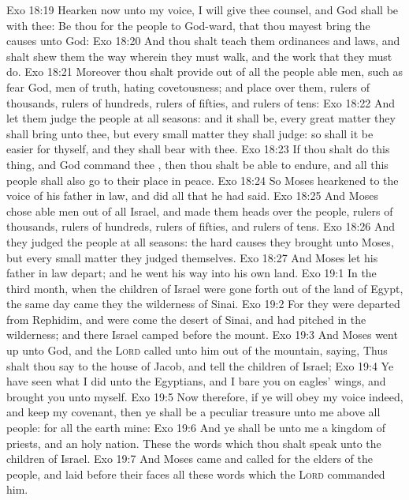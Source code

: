 \vs Exo 18:19 Hearken now unto my voice, I will give thee counsel, and God shall be with thee: Be thou for the people to God-ward, that thou mayest bring the causes unto God:
\vs Exo 18:20 And thou shalt teach them ordinances and laws, and shalt shew them the way wherein they must walk, and the work that they must do.
\vs Exo 18:21 Moreover thou shalt provide out of all the people able men, such as fear God, men of truth, hating covetousness; and place  over them,  rulers of thousands,  rulers of hundreds, rulers of fifties, and rulers of tens:
\vs Exo 18:22 And let them judge the people at all seasons: and it shall be,  every great matter they shall bring unto thee, but every small matter they shall judge: so shall it be easier for thyself, and they shall bear  with thee.
\vs Exo 18:23 If thou shalt do this thing, and God command thee , then thou shalt be able to endure, and all this people shall also go to their place in peace.
\vs Exo 18:24 So Moses hearkened to the voice of his father in law, and did all that he had said.
\vs Exo 18:25 And Moses chose able men out of all Israel, and made them heads over the people, rulers of thousands, rulers of hundreds, rulers of fifties, and rulers of tens.
\vs Exo 18:26 And they judged the people at all seasons: the hard causes they brought unto Moses, but every small matter they judged themselves.
\vs Exo 18:27 And Moses let his father in law depart; and he went his way into his own land.
\vs Exo 19:1 In the third month, when the children of Israel were gone forth out of the land of Egypt, the same day came they  the wilderness of Sinai.
\vs Exo 19:2 For they were departed from Rephidim, and were come  the desert of Sinai, and had pitched in the wilderness; and there Israel camped before the mount.
\vs Exo 19:3 And Moses went up unto God, and the \textsc{Lord} called unto him out of the mountain, saying, Thus shalt thou say to the house of Jacob, and tell the children of Israel;
\vs Exo 19:4 Ye have seen what I did unto the Egyptians, and  I bare you on eagles' wings, and brought you unto myself.
\vs Exo 19:5 Now therefore, if ye will obey my voice indeed, and keep my covenant, then ye shall be a peculiar treasure unto me above all people: for all the earth  mine:
\vs Exo 19:6 And ye shall be unto me a kingdom of priests, and an holy nation. These  the words which thou shalt speak unto the children of Israel.
\vs Exo 19:7 And Moses came and called for the elders of the people, and laid before their faces all these words which the \textsc{Lord} commanded him.
